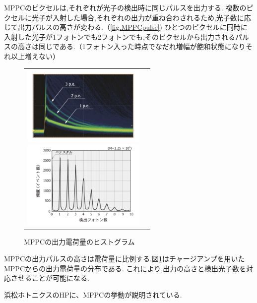 MPPCのピクセルは,それぞれが光子の検出時に同じパルスを出力する.
複数のピクセルに光子が入射した場合,それぞれの出力が重ね合わされるため,光子数に応じて出力パルスの高さが変わる.（\ref{fig.MPPCpulse})
ひとつのピクセルに同時に入射した光子が1フォトンでも2フォトンでも,そのピクセルから出力されるパルスの高さは同じである.（1フォトン入った時点でなだれ増幅が飽和状態になりそれ以上増えない）
\begin{figure}[H]
	\begin{tabular}{cc}
		\begin{minipage}[t]{0.5\hsize}
  			\begin{center}
    			\includegraphics[width=6cm]{../MPPCpulse.png}
    			\caption{MPPCの出力パルス波形}\label{fig.MPPCpulse}	
  			\end{center}
		\end{minipage}
		\begin{minipage}[t]{0.5\hsize}
  			\begin{center}
    			\includegraphics[width=6cm]{../MPPCcharge.png}
    			\caption{MPPCの出力電荷量のヒストグラム}\label{fig.MPPCcharge}	
  			\end{center}
		\end{minipage}
	\end{tabular}
\end{figure}

MPPCの出力パルスの高さは電荷量に比例する.図\ref{fig.MPPCcharge}はチャージアンプを用いたMPPCからの出力電荷量の分布である.
これにより,出力の高さと検出光子数を対応させることが可能になる.

浜松ホトニクスのHPに、MPPCの挙動が説明されている.\cite{hamamatsu}

